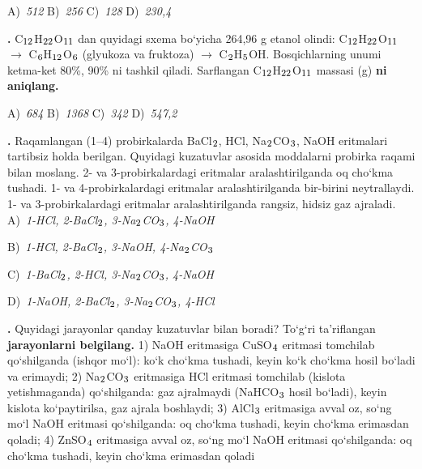 \documentclass[11pt,a4paper]{article}
\renewcommand{\textsubscript}[1]{\ensuremath{_{\text{\fontsize{8}{8}\selectfont #1}}}}
\newcommand{\qn}[1]{\textbf{\fontsize{11.5}{13}\selectfont #1}}
\newcommand{\qsep}{\par\vspace{13pt}}
\begin{document}
\begin{multicols}{2}
\noindent A)~\textsl{512} \hfill B)~\textsl{256} \hfill C)~\textsl{128} \hfill D)~\textsl{230,4}\par
\qsep
\noindent\qn{29.} C\textsubscript{12}H\textsubscript{22}O\textsubscript{11} dan quyidagi sxema bo`yicha 264,96 g etanol olindi: C\textsubscript{12}H\textsubscript{22}O\textsubscript{11} $\to$ C\textsubscript{6}H\textsubscript{12}O\textsubscript{6} (glyukoza va fruktoza) $\to$ C\textsubscript{2}H\textsubscript{5}OH. Bosqichlarning unumi ketma-ket 80\%, 90\% ni tashkil qiladi. Sarflangan C\textsubscript{12}H\textsubscript{22}O\textsubscript{11} massasi (g) \textbf{ni aniqlang.}

\noindent A)~\textsl{684} \hfill B)~\textsl{1368} \hfill C)~\textsl{342} \hfill D)~\textsl{547,2}\par
\qsep
\noindent\qn{30.} Raqamlangan (1--4) probirkalarda BaCl\textsubscript{2}, HCl, Na\textsubscript{2}CO\textsubscript{3}, NaOH eritmalari tartibsiz holda berilgan. Quyidagi kuzatuvlar asosida moddalarni probirka raqami bilan moslang. 2- va 3-probirkalardagi eritmalar aralashtirilganda oq cho`kma tushadi. 1- va 4-probirkalardagi eritmalar aralashtirilganda bir-birini neytrallaydi. 1- va 3-probirkalardagi eritmalar aralashtirilganda rangsiz, hidsiz gaz ajraladi.
\noindent A)~\textsl{1-HCl, 2-BaCl\textsubscript{2}, 3-Na\textsubscript{2}CO\textsubscript{3}, 4-NaOH}\par
\noindent B)~\textsl{1-HCl, 2-BaCl\textsubscript{2}, 3-NaOH, 4-Na\textsubscript{2}CO\textsubscript{3}}\par
\noindent C)~\textsl{1-BaCl\textsubscript{2}, 2-HCl, 3-Na\textsubscript{2}CO\textsubscript{3}, 4-NaOH}\par
\noindent D)~\textsl{1-NaOH, 2-BaCl\textsubscript{2}, 3-Na\textsubscript{2}CO\textsubscript{3}, 4-HCl}\par
\qsep
\noindent\qn{31.} Quyidagi jarayonlar qanday kuzatuvlar bilan boradi? To`g`ri ta'riflangan \textbf{jarayonlarni belgilang.} 1) NaOH eritmasiga CuSO\textsubscript{4} eritmasi tomchilab qo`shilganda (ishqor mo`l): ko`k cho`kma tushadi, keyin ko`k cho`kma hosil bo`ladi va erimaydi; 2) Na\textsubscript{2}CO\textsubscript{3} eritmasiga HCl eritmasi tomchilab (kislota yetishmaganda) qo`shilganda: gaz ajralmaydi (NaHCO\textsubscript{3} hosil bo`ladi), keyin kislota ko`paytirilsa, gaz ajrala boshlaydi; 3) AlCl\textsubscript{3} eritmasiga avval oz, so`ng mo`l NaOH eritmasi qo`shilganda: oq cho`kma tushadi, keyin cho`kma erimasdan qoladi; 4) ZnSO\textsubscript{4} eritmasiga avval oz, so`ng mo`l NaOH eritmasi qo`shilganda: oq cho`kma tushadi, keyin cho`kma erimasdan qoladi


\end{multicols}
\end{document}
